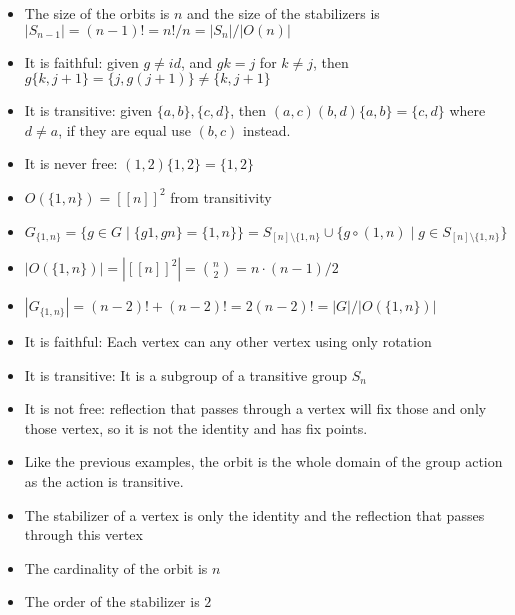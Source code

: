 \begin{cExercise}
\begin{cPart}
\begin{itemize}
			\item The size of the orbits is $n$ and the size of the stabilizers is $|S_{n-1}|=(n-1)!=n!/n=|S_n|/|O(n)|$
		\end{itemize}
	\end{cPart}
	\begin{cPart}
		\begin{itemize}
			\item It is faithful: given $g\ne id$, and $gk=j$ for $k\ne j$, then $g\{k,j+1\}=\{j,g(j+1)\}\ne \{k,j+1\}$
			\item It is transitive: given $\{a,b\},\{c,d\}$, then $(a,c)(b,d)\{a,b\}=\{c,d\}$ where $d\ne a$, if they are equal use $(b,c)$ instead.
			\item It is never free: $(1,2)\{1,2\}=\{1,2\}$
			\item $O(\{1,n\})=[[n]]^2$ from transitivity
			\item $G_{\{1,n\}}=\{g\in G\mid \{g1,gn\}=\{1,n\}\}=S_{[n]\setminus \{1,n\}}\cup\{g\circ(1,n)\mid g\in S_{[n]\setminus \{1,n\}}\}$
			\item $|O(\{1,n\})|=|[[n]]^2|=\binom{n}{2}=n\cdot (n-1)/2$
			\item $|G_{\{1,n\}}|=(n-2)!+(n-2)!=2(n-2)!=|G|/|O(\{1,n\})|$
		\end{itemize}
	\end{cPart}
	\begin{cPart}
		\begin{itemize}
			\item It is faithful: Each vertex can any other vertex using only rotation
			\item It is transitive: It is a subgroup of a transitive group $S_n$
			\item It is not free: reflection that passes through a vertex will fix those and only those vertex, so it is not the identity and has fix points. 
			\item Like the previous examples, the orbit is the whole domain of the group action as the action is transitive.
			\item The stabilizer of a vertex is only the identity and the reflection that passes through this vertex
			\item The cardinality of the orbit is $n$
			\item The order of the stabilizer is $2$
		\end{itemize}
	\end{cPart}
\end{cExercise}
